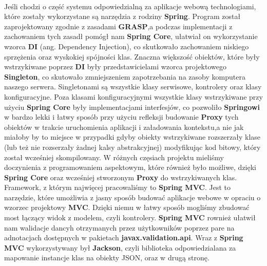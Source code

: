 \paragraph{}
Jeśli chodzi o część systemu odpowiedzialną za aplikacje webową technologiami, które zostały wykorzystane są narzędzia z rodziny \textbf{Spring}. Program został zaprojektowany zgodnie z zasadami \textbf{GRASP},a podczas implementacji z zachowaniem tych zasadł pomógł nam \textbf{Spring Core}, ułatwiał on wykorzystanie wzorca \textbf{DI} (ang. Dependency Injection), co skutkowało zachowaniem niskiego sprzężenia oraz wyskokiej spójności klas. Znaczna większość obiektów, które były wstrzykiwane poprzez \textbf{DI} były przedstawicielami wzorca projektowego \textbf{Singleton}, co skutowało zmniejszeniem zapotrzebania na zasoby komputera naszego serwera. Singletonami są wszystkie klasy serwisowe, kontrolery oraz klasy konfiguracyjne. Poza klasami konfiguracyjnymi wszystkie klasy wstrzykiwane przy użyciu \textbf{Spring Core} były implementacjami interfesjów, co pozwoliło \textbf{Springowi} w bardzo lekki i łatwy sposób przy użyciu refleksji budowanie \textbf{Proxy} tych obiektów w trakcie uruchomienia aplikacji i załadowania kontekstu,a nie jak miałoby by to miejsce w przypadki gdyby obiekty wstrzykiwane rozszerzały klase (lub też nie rozserzały żadnej kalsy abstrakcyjnej) modyfikując kod bitowy, który został wcześniej skompilowany. W różnych częsiach projektu mieliśmy doczynienia z programowaniem aspektowym, które również było możliwe, dzięki \textbf{Spring Core} oraz wcześniej stworzonym \textbf{Proxy} do wstrzykiwanych klas. Framework, z którym najwięcej pracowaliśmy to \textbf{Spring MVC}. Jest to narzędzie, które umożliwia z jasny sposób budować aplikacje webowe w opraciu o wzorzec projektowy \textbf{MVC}. Dzięki niemu w łatwy sposób mogliśmy zbudować most łączący widok z modelem, czyli kontrolery. \textbf{Spring MVC} rownież ułatwił nam walidacje dancyh otrzymanych przez użytkowników poprzez pare na adnotacjach dostępnych w pakietach \textbf{javax.validation.api}. Wraz z \textbf{Spring MVC} wykorzystywany był \textbf{Jackson}, czyli biblioteka odpowiedzialana za mapowanie instancje klas na obiekty JSON, oraz w drugą stronę.

